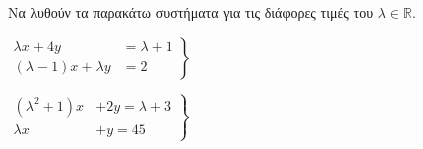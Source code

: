 Να λυθούν τα παρακάτω συστήματα για τις διάφορες τιμές του $ \lambda\in\mathbb{R} $.
\begin{alist}
\item $\left.\begin{array}{rl}
\lambda x+4 y & =\lambda+1 \\
(\lambda-1) x+\lambda y & =2
\end{array}\right\}$
\item $\left.\begin{array}{rl}\left(\lambda^2+1\right) x&+2 y =\lambda+3 \\ \lambda x& +y=45\end{array}\right\}$
\end{alist}
